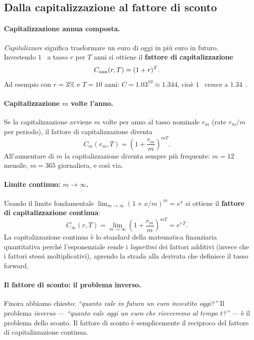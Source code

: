\documentclass[11pt,a4paper]{article}
\theoremstyle{plain}
\theoremstyle{definition}
\theoremstyle{remark}
\begin{document}
\subsection{Dalla capitalizzazione al fattore di sconto}

\paragraph{Capitalizzazione annua composta.}
\emph{Capitalizzare} significa trasformare un euro di oggi in pi\`u euro in futuro.
Investendo $1$~\texteuro{} a tasso $r$ per $T$ anni si ottiene il
\textbf{fattore di capitalizzazione}
\[
  C_{\rm ann}(r,T) = (1+r)^T.
\]
Ad esempio con $r=3\%$ e $T=10$ anni: $C = 1.03^{10} \approx 1.344$, cio\`e $1$~\texteuro{}
cresce a $1.34$~\texteuro{}.

\paragraph{Capitalizzazione $m$ volte l'anno.}
Se la capitalizzazione avviene $m$ volte per anno al tasso nominale $r_m$ (rate $r_m/m$
per periodo), il fattore di capitalizzazione diventa
\[
  C_m(r_m,T) = \left(1 + \frac{r_m}{m}\right)^{mT}.
\]
All'aumentare di $m$ la capitalizzazione diventa sempre pi\`u frequente: $m=12$ mensile,
$m=365$ giornaliera, e cos\`i via.

\paragraph{Limite continuo: $m \to \infty$.}
Usando il limite fondamentale $\lim_{m\to\infty}(1+x/m)^m = e^x$ si ottiene il
\textbf{fattore di capitalizzazione continua}:
\begin{equation}
  C_\infty(r,T) = \lim_{m\to\infty}\left(1+\frac{r_m}{m}\right)^{mT} = e^{r\,T}.
  \label{eq:cap-cont}
\end{equation}
La capitalizzazione continua \`e lo standard della matematica finanziaria quantitativa
perch\'e l'esponenziale rende i \emph{logaritmi} dei fattori additivi (invece che i fattori
stessi moltiplicativi), aprendo la strada alla derivata che definisce il tasso forward.

\paragraph{Il fattore di sconto: il problema inverso.}
Finora abbiamo chiesto: \emph{``quanto vale in futuro un euro investito oggi?''} Il problema
\emph{inverso} --- \emph{``quanto vale oggi un euro che riceveremo al tempo $t$?''} --- \`e
il problema dello sconto. Il fattore di sconto \`e semplicemente il reciproco del fattore
di capitalizzazione continua.
\end{document}
